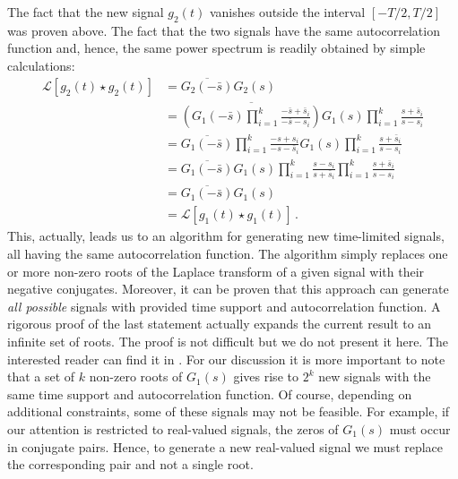 The fact that the new signal $g_{2}(t)$ vanishes outside the interval
$[-T/2, T/2]$ was proven above. The fact that the two signals have
the same autocorrelation function and, hence, the same power spectrum
is readily obtained by simple calculations:
\begin{equation}
  \label{eq:96}
  \begin{split}
    \mathcal{L}[g_{2}(t)\star g_{2}(t)]
    & = \overline{ G_{2}(-\bar s)}G_{2}(s)\\
    & =
    \overline{\left(
        G_{1}(-\bar s)\prod_{i=1}^{k}\frac{-\bar s+\bar s_{i}}{-\bar s-s_{i}}
      \right)} G_{1}(s)\prod_{i=1}^{k}\frac{s+\bar s_{i}}{s-s_{i}}\\
    & = \overline{G_{1}(-\bar s)}\prod_{i=1}^{k}\frac{-s+s_{i}}{-s-\bar s_{i}}
    G_{1}(s)\prod_{i=1}^{k}\frac{s+\bar s_{i}}{s-s_{i}}\\
    & = \overline{G_{1}(-\bar s)}G_{1}(s)
    \prod_{i=1}^{k}\frac{s-s_{i}}{s+\bar s_{i}}
    \prod_{i=1}^{k}\frac{s+\bar s_{i}}{s-s_{i}} \\
    & =  \overline{G_{1}(-\bar s)}G_{1}(s)\\
    & = \mathcal{L}[g_{1}(t)\star g_{1}(t)] \,. 
  \end{split}
\end{equation}
This, actually, leads us to an algorithm for generating new time-limited 
signals, all having the same autocorrelation function. The algorithm
simply replaces one or more non-zero roots of the Laplace transform of a
given signal with their negative conjugates. Moreover, it can be
proven that this approach can generate \emph{all possible} signals
with provided time support and autocorrelation function. A rigorous
proof of the last statement actually expands the current result to an
infinite set of roots. The proof is not difficult but we do not
present it here. The interested reader can find it in
. For our discussion it is more
important to note that a set of $k$ non-zero roots of $G_{1}(s)$ gives
rise to $2^{k}$ new signals with the same time support and autocorrelation
function. Of course, depending on additional constraints, some of
these signals may not be feasible. For example, if our attention is
restricted to real-valued signals, the zeros of $G_{1}(s)$ must occur in
conjugate pairs. Hence, to generate a new real-valued signal we must
replace the corresponding pair and not a single root.

